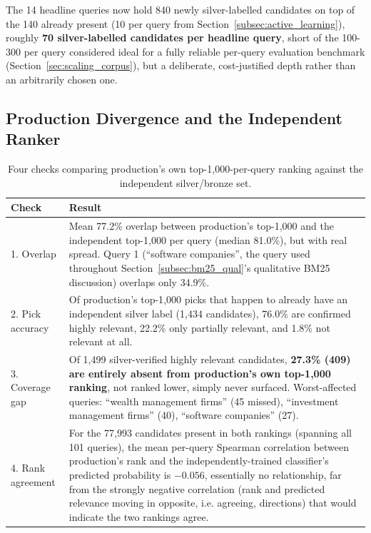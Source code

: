 \documentclass[a4paper,oneside,bibliography=totoc]{scrbook}
\begin{document}
The 14 headline queries now hold 840 newly silver-labelled candidates on top of the 140 already present (10 per query from Section~\ref{subsec:active_learning}), roughly \textbf{70 silver-labelled candidates per headline query}, short of the 100-300 per query considered ideal for a fully reliable per-query evaluation benchmark (Section~\ref{sec:scaling_corpus}), but a deliberate, cost-justified depth rather than an arbitrarily chosen one.

\subsection{Production Divergence and the Independent Ranker}
\label{subsec:production_divergence_result}

\begin{table}[ht]
\centering
\caption{Four checks comparing production's own top-1,000-per-query ranking against the independent silver/bronze set.}
\label{tab:production_divergence}
\begin{tabular}{p{3cm}p{11cm}}
\toprule
\textbf{Check} & \textbf{Result} \\
\midrule
1. Overlap & Mean 77.2\% overlap between production's top-1{,}000 and the independent top-1{,}000 per query (median 81.0\%), but with real spread. Query 1 (``software companies'', the query used throughout Section~\ref{subsec:bm25_qual}'s qualitative BM25 discussion) overlaps only 34.9\%. \\
2. Pick accuracy & Of production's top-1{,}000 picks that happen to already have an independent silver label (1{,}434 candidates), 76.0\% are confirmed highly relevant, 22.2\% only partially relevant, and 1.8\% not relevant at all. \\
3. Coverage gap & Of 1{,}499 silver-verified highly relevant candidates, \textbf{27.3\% (409) are entirely absent from production's own top-1{,}000 ranking}, not ranked lower, simply never surfaced. Worst-affected queries: ``wealth management firms'' (45 missed), ``investment management firms'' (40), ``software companies'' (27). \\
4. Rank agreement & For the 77{,}993 candidates present in both rankings (spanning all 101 queries), the mean per-query Spearman correlation between production's rank and the independently-trained classifier's predicted probability is \textbf{$-0.056$}, essentially no relationship, far from the strongly negative correlation (rank and predicted relevance moving in opposite, i.e. agreeing, directions) that would indicate the two rankings agree. \\
\bottomrule
\end{tabular}
\end{table}
\end{document}
